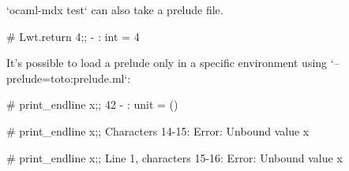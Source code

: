 `ocaml-mdx test` can also take a prelude file.

\begin{ocaml}
# Lwt.return 4;;
- : int = 4
\end{ocaml}

It's possible to load a prelude only in a specific environment using
`--prelude=toto:prelude.ml`:

\begin{ocaml}
# print_endline x;;
42
- : unit = ()
\end{ocaml}

\begin{ocaml}
# print_endline x;;
Characters 14-15:
Error: Unbound value x
\end{ocaml}

\begin{ocaml}
# print_endline x;;
Line 1, characters 15-16:
Error: Unbound value x
\end{ocaml}
